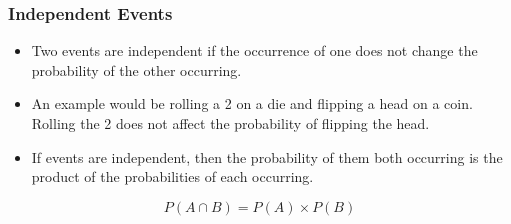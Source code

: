 \documentclass[IntroMain.tex]{subfiles}
\begin{document}
\begin{frame}
\frametitle{Independent Events}
\Large
\begin{itemize}
\item Two events are independent if the occurrence of one does not change the probability of the other occurring.
\item An example would be rolling a 2 on a die and flipping a head on a coin. Rolling the 2 does not affect the probability of flipping the head.
\item If events are independent, then the probability of them both occurring is the product of the probabilities of each occurring.
\end{itemize}
   \[P(A \cap B) = P(A) \times P(B)\]
\end{frame}
\end{document}

